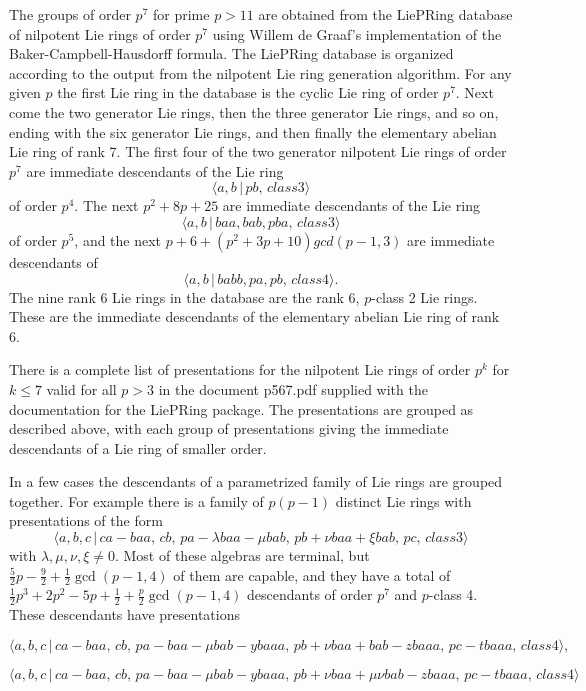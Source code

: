 The groups of order $p^{7}$ for prime $p>11$ are obtained from the LiePRing
database of nilpotent Lie rings of order $p^{7}$ using Willem de Graaf's
implementation of the Baker-Campbell-Hausdorff formula. The LiePRing
database is organized according to the output from the nilpotent Lie ring
generation algorithm. For any given $p$ the first Lie ring in the database
is the cyclic Lie ring of order $p^{7}$. Next come the two generator Lie
rings, then the three generator Lie rings, and so on, ending with the six
generator Lie rings, and then finally the elementary abelian Lie ring of
rank 7. The first four of the two generator nilpotent Lie rings of order 
$p^{7}$ are immediate descendants of the Lie ring
$$
\langle a,b\,|\,pb,\,class 3\rangle 
$$
of order $p^{4}$. The next $p^{2}+8p+25$ are immediate descendants of the
Lie ring
$$
\langle a,b\,|\,baa,bab,pba,\,class 3\rangle 
$$
of order $p^{5}$, and the next $p+6+(p^{2}+3p+10) gcd(p-1,3)$ are immediate
descendants of
$$
\langle a,b\,|\,babb,pa,pb,\,class 4\rangle . 
$$
The nine rank 6 Lie rings in the database are the rank 6, $p$-class 2 
Lie rings. These are the immediate descendants of the elementary abelian 
Lie ring of rank 6.

There is a complete list of presentations for the nilpotent Lie rings of
order $p^{k}$ for $k\leq 7$ valid for all $p>3$ in the document p567.pdf
supplied with the documentation for the LiePRing package. The presentations
are grouped as described above, with each group of presentations giving the
immediate descendants of a Lie ring of smaller order.

In a few cases the descendants of a parametrized family of Lie rings are
grouped together. For example there is a family of $p(p-1)$ distinct Lie
rings with presentations of the form
$$
\langle a,b,c\,|\,ca-baa,\,cb,\,pa-\lambda baa-\mu bab,\,pb+\nu baa+\xi
bab,\,pc,\,class 3\rangle 
$$
with $\lambda ,\mu ,\nu ,\xi \neq 0$. Most of these algebras are terminal,
but $\frac{5}{2}p-\frac{9}{2}+\frac{1}{2}\gcd (p-1,4)$ of them are capable,
and they have a total of $\frac{1}{2}p^{3}+2p^{2}-5p+\frac{1}{2}+\frac{p}{2}%
\gcd (p-1,4)$ descendants of order $p^{7}$ and $p$-class 4. These
descendants have presentations

$$
\langle a,b,c\,|\,ca-baa,\,cb,\,pa-baa-\mu bab-ybaaa,\,pb+\nu
baa+bab-zbaaa,\,pc-tbaaa,\,class 4\rangle , 
$$

$$
\langle a,b,c\,|\,ca-baa,\,cb,\,pa-baa-\mu bab-ybaaa,\,pb+\nu baa+\mu \nu
bab-zbaaa,\,pc-tbaaa,\,class 4\rangle 
$$

